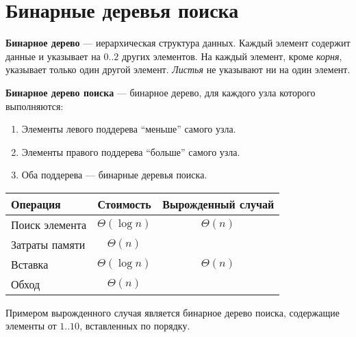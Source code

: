 \section{Бинарные деревья поиска}
\label{sec:trees}

\textbf{Бинарное дерево} --- иерархическая структура данных. Каждый элемент содержит данные и указывает на $0..2$ других элементов. На каждый элемент, кроме \emph{корня}, указывает только один другой элемент. \emph{Листья} не указывают ни на один элемент.

\textbf{Бинарное дерево поиска} --- бинарное дерево, для каждого узла которого выполняются:
\begin{enumerate}
  \item Элементы левого поддерева ``меньше'' самого узла.
  \item Элементы правого поддерева ``больше'' самого узла.
  \item Оба поддерева --- бинарные деревья поиска.
\end{enumerate}

\begin{center}
  \begin{tabular}{lcc}
    \toprule
    Операция & Стоимость & Вырожденный случай \\
    \midrule
    Поиск элемента & $\Theta(\log n)$ & $\Theta(n)$ \\
    Затраты памяти & $\Theta(n)$ & \\
    Вставка & $\Theta(\log n)$ & $\Theta(n)$ \\
    Обход & $\Theta(n)$ & \\
    \bottomrule
  \end{tabular}
\end{center}

Примером вырожденного случая является бинарное дерево поиска, содержащие элементы от $1..10$, вставленных по порядку.

